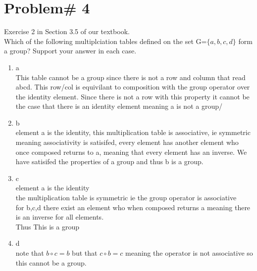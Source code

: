 \documentclass[11pt]{article}
\theoremstyle{definition}  %
\newcommand{\bigline}{\\\noindent\makebox[\linewidth]{\rule{\paperwidth}{0.4pt}}\\}
\begin{document}
\section* {Problem# 4} Exercise 2 in Section 3.5 of our textbook.\\
Which of the following multiplciation tables defined on the set G=$\{a,b,c,d\}$ form a group? Support your answer in each case. \\
\begin{enumerate}
  \item a\\
  This table cannot be a group since there is not a row and column that read abcd. This row/col  is equivilant to composition with the group operator over the identity element. Since there is not a row with this property it cannot be the case that there is an identity element meaning a is not a group/
  \item b\\
  element a is the identity, this multiplication table is associative, ie symmetric meaning associativity is satisifed, every element has another element who once composed returns to a, meaning that every element has an inverse. We have satisifed the properties of a group and thus b is a group.
  \item c\\
  element a is the identity\\
  the multiplication table is symmetric ie the group operator is associative\\
  for b,c,d there exist an element who when composed returns a meaning there is an inverse for all elements. \\
  Thus This is a group
  \item d\\
  note that $b\circ c=b$ but that $c\circ b =c $ meaning the operator is not associative so this cannot be a group.

\end{enumerate}
\bigline
\end{document}
